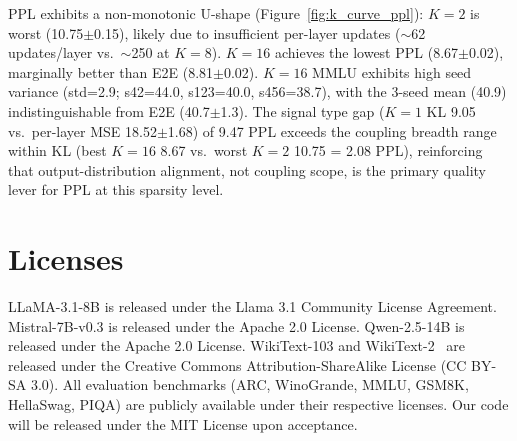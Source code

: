\begin{table}[h]
\centering
\caption{K-curve: coupling breadth vs.\ predictor quality (30\%, TEAL uniform, LLaMA-3.1-8B). All values are 3-seed mean$\pm$std (s42/s123/s456) except $K{=}1$ downstream (single seed). ``---'' = not evaluated.}
\label{tab:k_curve}
\end{table}

PPL exhibits a non-monotonic U-shape (Figure~\ref{fig:k_curve_ppl}): $K{=}2$ is worst (10.75$\pm$0.15), likely due to insufficient per-layer updates (${\sim}$62 updates/layer vs.\ ${\sim}$250 at $K{=}8$). $K{=}16$ achieves the lowest PPL (8.67$\pm$0.02), marginally better than E2E (8.81$\pm$0.02). $K{=}16$ MMLU exhibits high seed variance (std=2.9; s42=44.0, s123=40.0, s456=38.7), with the 3-seed mean (40.9) indistinguishable from E2E (40.7$\pm$1.3).
The signal type gap ($K{=}1$ KL 9.05 vs.\ per-layer MSE 18.52$\pm$1.68) of 9.47 PPL exceeds the coupling breadth range within KL (best $K{=}16$ 8.67 vs.\ worst $K{=}2$ 10.75 = 2.08 PPL), reinforcing that output-distribution alignment, not coupling scope, is the primary quality lever for PPL at this sparsity level.

\section{Licenses}
\label{app:licenses}

LLaMA-3.1-8B is released under the Llama 3.1 Community License Agreement.
Mistral-7B-v0.3 is released under the Apache 2.0 License.
Qwen-2.5-14B is released under the Apache 2.0 License.
WikiText-103 and WikiText-2~\cite{merity2017pointer} are released under the Creative Commons Attribution-ShareAlike License (CC BY-SA 3.0).
All evaluation benchmarks (ARC, WinoGrande, MMLU, GSM8K, HellaSwag, PIQA) are publicly available under their respective licenses.
Our code will be released under the MIT License upon acceptance.

